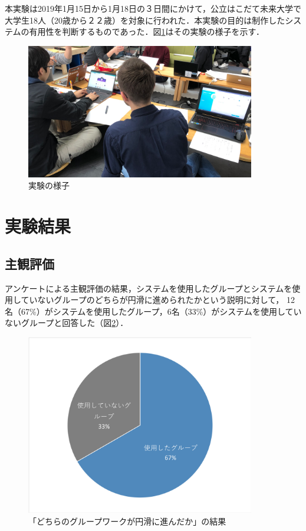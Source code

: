 \documentclass{funthesis}
\begin{document}
本実験は2019年1月15日から1月18日の３日間にかけて，公立はこだて未来大学で大学生18人（20歳から２２歳）を対象に行われた．本実験の目的は制作したシステムの有用性を判断するものであった．図\ref{zikkennnoyousu}はその実験の様子を示す．

\begin{figure}[H]
 \centering
   \includegraphics[width=100mm]{figures/zikkennyousu.png}
 \caption{実験の様子}
 \label{zikkennnoyousu}
\end{figure}



\section{実験結果}

\subsection{主観評価}
アンケートによる主観評価の結果，システムを使用したグループとシステムを使用していないグループのどちらが円滑に進められたかという説明に対して，
12名（67\%）がシステムを使用したグループ，6名（33\%）がシステムを使用していないグループと回答した（図\ref{testChart00}）．
\begin{figure}[H]
 \centering
   \includegraphics[width=100mm]{figures/finalExChart3.png}
 \caption{「どちらのグループワークが円滑に進んだか」の結果}
 \label{testChart00}
\end{figure}
\end{document}

